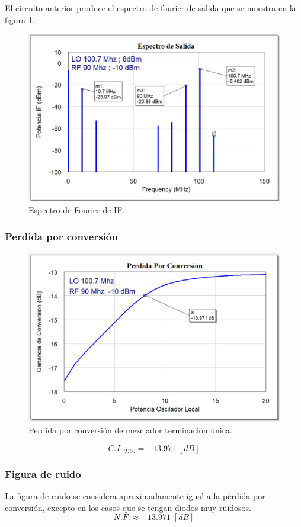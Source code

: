 \documentclass[twocolumn]{article}
\begin{document}
El circuito anterior produce el espectro de fourier de salida que se muestra en la figura \textcolor{blue}{\ref{fig:IF1}}.
\begin{figure}[h]
  \centering    
	\includegraphics[scale=0.28]{imagenes/IF1.jpg}
	\caption{Espectro de Fourier de IF.}\label{fig:IF1}
\end{figure}
%
\subsubsection{Perdida por conversión}
%
\begin{figure}[h]
  \centering    
	\includegraphics[width=\columnwidth]{imagenes/CL1.jpg}
	\caption{Perdida por conversión de mezclador terminación única.}\label{fig:CL1}
\end{figure}
\[C.L._{T.U.} = -13.971 \; [dB] \]
%
\subsubsection{Figura de ruido}
%
La figura de ruido se considera aproximadamente igual a la pérdida por conversión, excepto en los casos que se tengan diodos muy ruidosos.
\[N.F. \approx -13.971 \; [dB] \]
%
\end{document}
